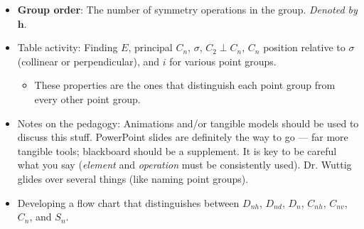 \documentclass[../notes.tex]{subfiles}
\begin{document}
\begin{itemize}
    \item \textbf{Group order}: The number of symmetry operations in the group. \emph{Denoted by} $\bm{h}$.
    \item Table activity: Finding $E$, principal $C_n$, $\sigma$, $C_2\perp C_n$, $C_n$ position relative to $\sigma$ (collinear or perpendicular), and $i$ for various point groups.
    \begin{itemize}
        \item These properties are the ones that distinguish each point group from every other point group.
    \end{itemize}
    \item Notes on the pedagogy: Animations and/or tangible models should be used to discuss this stuff. PowerPoint slides are definitely the way to go --- far more tangible tools; blackboard should be a supplement. It is key to be careful what you say (\emph{element} and \emph{operation} must be consistently used). Dr. Wuttig glides over several things (like naming point groups).
    \item Developing a flow chart that distinguishes between $D_{nh}$, $D_{nd}$, $D_n$, $C_{nh}$, $C_{nv}$, $C_n$, and $S_n$.
\end{itemize}
\end{document}
